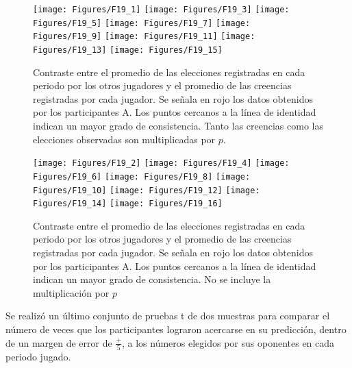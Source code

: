 \begin{figure}[hp]
\centering
\texttt{[image: Figures/F19\_1]} 
\texttt{[image: Figures/F19\_3]} 
\texttt{[image: Figures/F19\_5]} 
\texttt{[image: Figures/F19\_7]} 
\texttt{[image: Figures/F19\_9]} 
\texttt{[image: Figures/F19\_11]} 
\texttt{[image: Figures/F19\_13]} 
\texttt{[image: Figures/F19\_15]} 
\decoRule
\caption[Precisión en la predicción de los números a elegir por los otros participantes (se incluye la multiplicación por $p$ de las creencias y las elecciones observadas)]{Contraste entre el promedio de las elecciones registradas en cada periodo por los otros jugadores y el promedio de las creencias registradas por cada jugador. Se señala en rojo los datos obtenidos por los participantes A. Los puntos cercanos a la línea de identidad indican un mayor grado de consistencia. Tanto las creencias como las elecciones observadas son multiplicadas por $p$.}
\label{fig:Precision_p}
\end{figure}  


\begin{figure}[hp]
\centering
\texttt{[image: Figures/F19\_2]} 
\texttt{[image: Figures/F19\_4]} 
\texttt{[image: Figures/F19\_6]} 
\texttt{[image: Figures/F19\_8]} 
\texttt{[image: Figures/F19\_10]} 
\texttt{[image: Figures/F19\_12]} 
\texttt{[image: Figures/F19\_14]} 
\texttt{[image: Figures/F19\_16]} 
\decoRule
\caption[Precisión en la predicción de los números a elegir por los otros participantes (se omite la multiplicación por $p$)]{Contraste entre el promedio de las elecciones registradas en cada periodo por los otros jugadores y el promedio de las creencias registradas por cada jugador. Se señala en rojo los datos obtenidos por los participantes A. Los puntos cercanos a la línea de identidad indican un mayor grado de consistencia. No se incluye la multiplicación por $p$}
\label{fig:Precision_nop}
\end{figure}  

Se realizó un último conjunto de pruebas t de dos muestras para comparar el número de veces que los participantes lograron acercarse en su predicción, dentro de un margen de error de $\frac{+}{5}$, a los números elegidos por sus oponentes en cada periodo jugado.\\

